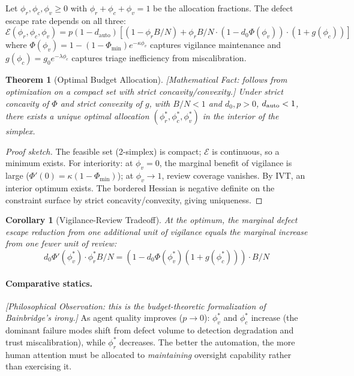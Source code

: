\documentclass[11pt, a4paper]{googledeepmind}
\newtheorem{theorem}{Theorem}[section]
\newtheorem{corollary}{Corollary}[section]
\begin{document}
Let $\phi_r, \phi_c, \phi_v \geq 0$ with $\phi_r + \phi_c + \phi_v = 1$ be the allocation fractions. The defect escape rate depends on all three:
\begin{equation}
\mathcal{E}(\phi_r, \phi_c, \phi_v) = p(1 - d_{\text{auto}}) \left[(1 - \phi_r B/N) + \phi_r B/N \cdot (1 - d_0 \Phi(\phi_v)) \cdot (1 + g(\phi_c))\right]
\end{equation}
where $\Phi(\phi_v) = 1 - (1 - \Phi_{\min}) e^{-\kappa \phi_v}$ captures vigilance maintenance and $g(\phi_c) = g_0 e^{-\lambda \phi_c}$ captures triage inefficiency from miscalibration.

\begin{theorem}[Optimal Budget Allocation]
\emph{[Mathematical Fact: follows from optimization on a compact set with strict concavity/convexity.]}
\label{thm:budget-optimal}
Under strict concavity of $\Phi$ and strict convexity of $g$, with $B/N < 1$ and $d_0, p > 0$, $d_{\textup{auto}} < 1$, there exists a unique optimal allocation $(\phi_r^*, \phi_c^*, \phi_v^*)$ in the interior of the simplex.
\end{theorem}

\begin{proof}[Proof sketch]
The feasible set (2-simplex) is compact; $\mathcal{E}$ is continuous, so a minimum exists. For interiority: at $\phi_v = 0$, the marginal benefit of vigilance is large ($\Phi'(0) = \kappa(1 - \Phi_{\min})$); at $\phi_v \to 1$, review coverage vanishes. By IVT, an interior optimum exists. The bordered Hessian is negative definite on the constraint surface by strict concavity/convexity, giving uniqueness.
\end{proof}

\begin{corollary}[Vigilance-Review Tradeoff]
\label{cor:tradeoff}
At the optimum, the marginal defect escape reduction from one additional unit of vigilance equals the marginal increase from one fewer unit of review:
\begin{equation}
d_0 \Phi'(\phi_v^*) \cdot \phi_r^* B/N = (1 - d_0 \Phi(\phi_v^*)(1 + g(\phi_c^*))) \cdot B/N
\end{equation}
\end{corollary}

\paragraph{Comparative statics.} \emph{[Philosophical Observation: this is the budget-theoretic formalization of Bainbridge's irony.]} As agent quality improves ($p \to 0$): $\phi_v^*$ and $\phi_c^*$ increase (the dominant failure modes shift from defect volume to detection degradation and trust miscalibration), while $\phi_r^*$ decreases. The better the automation, the more human attention must be allocated to \emph{maintaining} oversight capability rather than exercising it.
\end{document}
